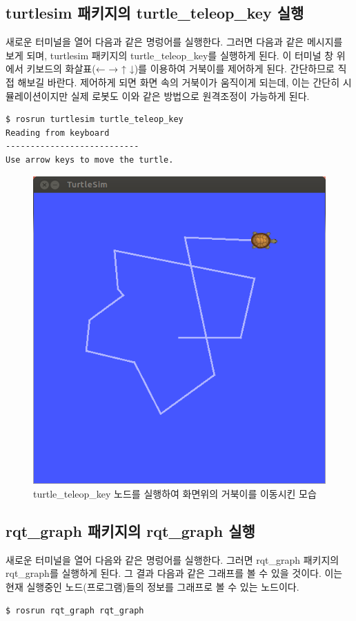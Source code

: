 \subsection{turtlesim 패키지의 turtle\_teleop\_key 실행}
새로운 터미널을 열어 다음과 같은 명렁어를 실행한다. 그러면 다음과 같은 메시지를 보게 되며, turtlesim 패키지의 turtle\_teleop\_key를 실행하게 된다. 이 터미널 창 위에서 키보드의 화살표(← → ↑ ↓)를 이용하여 거북이를 제어하게 된다. 간단하므로 직접 해보길 바란다. 제어하게 되면 화면 속의 거북이가 움직이게 되는데, 이는 간단히 시뮬레이션이지만 실제 로봇도 이와 같은 방법으로 원격조정이 가능하게 된다.
\\
\begin{lstlisting}[language=ROS]
$ rosrun turtlesim turtle_teleop_key
Reading from keyboard
---------------------------
Use arrow keys to move the turtle.
\end{lstlisting}

\begin{figure}[h]
\centering\includegraphics[width=0.5\columnwidth]{pictures/chapter2/turtlesim_node_move.png}
\caption{turtle\_teleop\_key 노드를 실행하여 화면위의 거북이를 이동시킨 모습}
\end{figure}

\subsection{rqt\_graph 패키지의 rqt\_graph 실행}
새로운 터미널을 열어 다음와 같은 명렁어를 실행한다. 그러면 rqt\_graph 패키지의 rqt\_graph를 실행하게 된다. 그 결과 다음과 같은 그래프를 볼 수 있을 것이다. 이는 현재 실행중인 노드(프로그램)들의 정보를 그래프로 볼 수 있는 노드이다.
\\
\begin{lstlisting}[language=ROS]
$ rosrun rqt_graph rqt_graph
\end{lstlisting}

